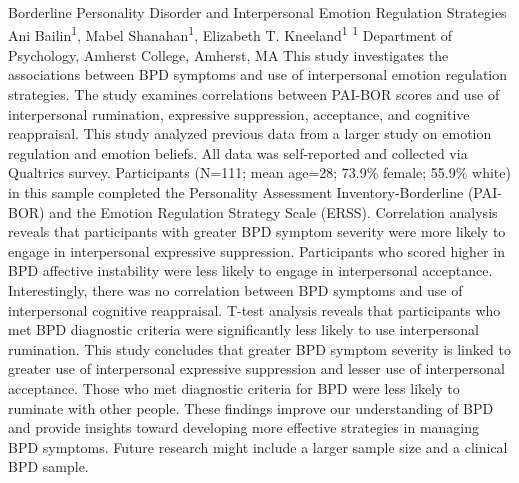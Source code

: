 \makeabstract
    {
    Borderline Personality Disorder and Interpersonal Emotion Regulation Strategies
    }
    {
    Ani Bailin\textsuperscript{1}, Mabel Shanahan\textsuperscript{1}, Elizabeth T. Kneeland\textsuperscript{1}
    }
    {
    \textsuperscript{1} Department of Psychology, Amherst College, Amherst, MA
    }
    {
    This study investigates the associations between BPD symptoms and use of interpersonal emotion regulation strategies. The study examines correlations between PAI-BOR scores and use of interpersonal rumination, expressive suppression, acceptance, and cognitive reappraisal. 
    }
    {
    This study analyzed previous data from a larger study on emotion regulation and emotion beliefs. All data was self-reported and collected via Qualtrics survey. Participants (N=111; mean age=28; 73.9\% female; 55.9\% white) in this sample completed the Personality Assessment Inventory-Borderline (PAI-BOR) and the Emotion Regulation Strategy Scale (ERSS). 
    }
    {
    Correlation analysis reveals that participants with greater BPD symptom severity were more likely to engage in interpersonal expressive suppression. Participants who scored higher in BPD affective instability were less likely to engage in interpersonal acceptance. Interestingly, there was no correlation between BPD symptoms and use of interpersonal cognitive reappraisal. T-test analysis reveals that participants who met BPD diagnostic criteria were significantly less likely to use interpersonal rumination.
    }
    {
    This study concludes that greater BPD symptom severity is linked to greater use of interpersonal expressive suppression and lesser use of interpersonal acceptance. Those who met diagnostic criteria for BPD were less likely to ruminate with other people. These findings improve our understanding of BPD and provide insights toward developing more effective strategies in managing BPD symptoms. Future research might include a larger sample size and a clinical BPD sample. 
    }

    \newpage
    